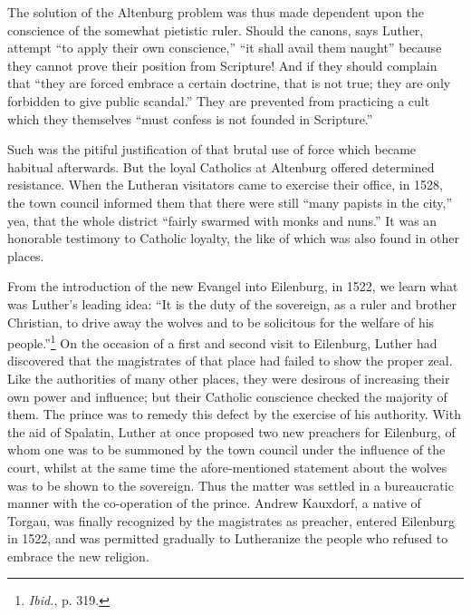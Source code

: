 The solution of the Altenburg problem was thus made dependent
upon the conscience of the somewhat pietistic ruler. Should the canons,
says Luther, attempt “to apply their own conscience,” “it shall
avail them naught” because they cannot prove their position from
Scripture! And if they should complain that “they are forced embrace
a certain doctrine, that is not true; they are only forbidden to
give public scandal.” They are prevented from practicing a cult which
they themselves “must confess is not founded in Scripture.”

Such was the pitiful justification of that brutal use of force which
became habitual afterwards. But the loyal Catholics at Altenburg
offered determined resistance. When the Lutheran visitators
came to exercise their office, in 1528, the town council informed
them that there were still “many papists in the city,” yea, that the
whole district “fairly swarmed with monks and nuns.” It was an
honorable testimony to Catholic loyalty, the like of which was also
found in other places.

From the introduction of the new Evangel into Eilenburg, in 1522,
we learn what was Luther’s leading idea: “It is the duty of the sovereign,
as a ruler and brother Christian, to drive away the wolves and to
be solicitous for the welfare of his people.”\footnote{\textit{Ibid.}, p. 319.}
On the occasion of
a first and second visit to Eilenburg, Luther had discovered that the
magistrates of that place had failed to show the proper zeal. Like the
authorities of many other places, they were desirous of increasing
their own power and influence; but their Catholic conscience checked
the majority of them. The prince was to remedy this defect by the
exercise of his authority. With the aid of Spalatin, Luther at once
proposed two new preachers for Eilenburg, of whom one was to be
summoned by the town council under the influence of the court,
whilst at the same time the afore-mentioned statement about the
wolves was to be shown to the sovereign. Thus the matter was settled
in a bureaucratic manner with the co-operation of the prince. Andrew
Kauxdorf, a native of Torgau, was finally recognized by the
magistrates as preacher, entered Eilenburg in 1522, and was permitted gradually
to Lutheranize the people who refused to embrace the new religion.

